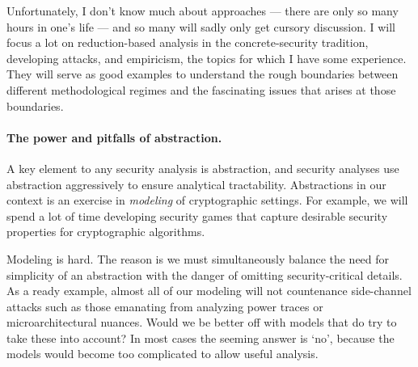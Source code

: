 Unfortunately, I don't know much about approaches --- there
are only so many hours in one's life --- and so many will sadly only get cursory
discussion.  I will focus a lot on reduction-based analysis in the
concrete-security tradition,  developing attacks, and empiricism, the topics for
which I have some experience. They will serve as good examples to understand the
rough boundaries between different methodological regimes and the fascinating
issues that arises at those boundaries. 


\paragraph{The power and pitfalls of abstraction.}  A key element to any
security analysis is abstraction, and security analyses use abstraction
aggressively to ensure analytical tractability. Abstractions in our context is an exercise
in \emph{modeling} of cryptographic settings.  For example, we will spend a lot
of time developing security games that capture desirable security properties for
cryptographic algorithms. 

Modeling is hard. The reason is we must simultaneously balance the need for
simplicity of an abstraction with the danger of omitting security-critical
details. As a ready example, almost all of our modeling will not countenance
side-channel attacks such as those emanating from analyzing power traces or
microarchitectural nuances.  Would we be better off with models that do try to
take these into account?  In most cases the seeming answer is `no', because the
models would become too complicated to allow useful analysis. 


